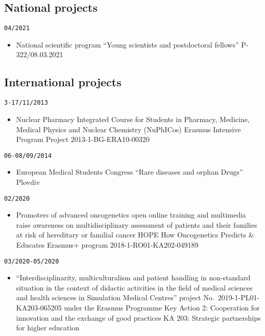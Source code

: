 \documentclass[
  12pt,
  letterpaper,
  DIV=11,
  numbers=noendperiod]{scrartcl}
\providecommand{\tightlist}{%
  \setlength{\itemsep}{0pt}\setlength{\parskip}{0pt}}\usepackage{longtable,booktabs,array}
\begin{document}
\subsection{National projects}\label{national-projects}

\texttt{04/2021}

\begin{itemize}
\tightlist
\item
  National scientific program ``Young scientists and postdoctoral
  fellows'' \textbar{} P-322/08.03.2021
\end{itemize}

\subsection{International projects}\label{international-projects}

\texttt{3-17/11/2013}

\begin{itemize}
\tightlist
\item
  Nuclear Pharmacy Integrated Course for Students in Pharmacy, Medicine,
  Medical Physics and Nuclear Chemistry (NuPhICos) \textbar{} Erasmus
  Intensive Program Project \textbar{} 2013-1-BG-ERA10-00320
\end{itemize}

\texttt{06-08/09/2014}

\begin{itemize}
\tightlist
\item
  European Medical Students Congress \textbar{} ``Rare diseases and
  orphan Drugs'' \textbar{} Plovdiv
\end{itemize}

\texttt{02/2020}

\begin{itemize}
\tightlist
\item
  Promoters of advanced oncogenetics open online training and multimedia
  raise awareness on multidisciplinary assessment of patients and their
  families at risk of hereditary or familial cancer \textbar{} HOPE How
  Oncogenetics Predicts \& Educates \textbar{} Erasmus+ program
  \textbar{} 2018-1-RO01-KA202-049189
\end{itemize}

\texttt{03/2020-05/2020}

\begin{itemize}
\tightlist
\item
  ``Interdisciplinarity, multiculturalism and patient handling in
  non-standard situation in the context of didactic activities in the
  field of medical sciences and health sciences in Simulation Medical
  Centres'' \textbar{} project No.~2019-1-PL01-KA203-065205 under the
  Erasmus Programme \textbar{} Key Action 2: Cooperation for innovation
  and the exchange of good practices \textbar{} KA 203: Strategic
  partnerships for higher education
\end{itemize}
\end{document}

